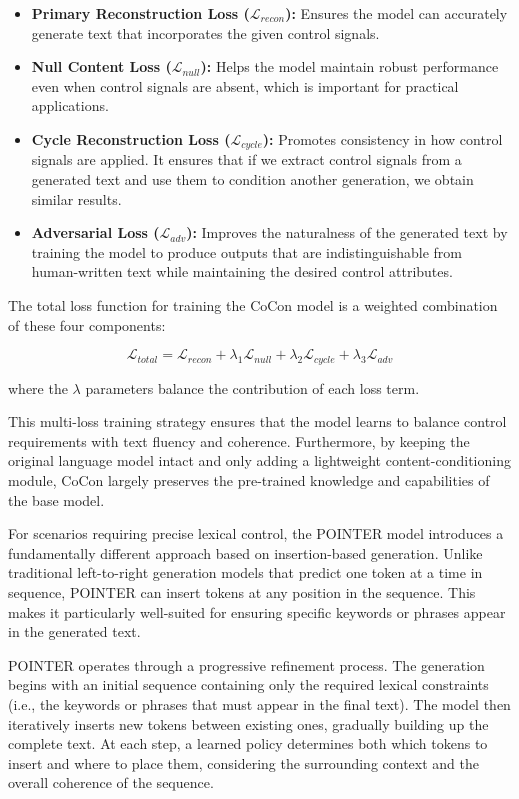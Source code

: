 \begin{itemize}
   \item \textbf{Primary Reconstruction Loss ($\mathcal{L}_{recon}$):} Ensures the model can accurately generate text that incorporates the given control signals.
   \item \textbf{Null Content Loss ($\mathcal{L}_{null}$):} Helps the model maintain robust performance even when control signals are absent, which is important for practical applications.
   \item \textbf{Cycle Reconstruction Loss ($\mathcal{L}_{cycle}$):} Promotes consistency in how control signals are applied. It ensures that if we extract control signals from a generated text and use them to condition another generation, we obtain similar results.
   \item \textbf{Adversarial Loss ($\mathcal{L}_{adv}$):} Improves the naturalness of the generated text by training the model to produce outputs that are indistinguishable from human-written text while maintaining the desired control attributes.
\end{itemize}

The total loss function for training the CoCon model is a weighted combination of these four components:

\begin{equation}
    \mathcal{L}_{total} = \mathcal{L}_{recon} + \lambda_1 \mathcal{L}_{null} + \lambda_2 \mathcal{L}_{cycle} + \lambda_3 \mathcal{L}_{adv}
\end{equation}

where the $\lambda$ parameters balance the contribution of each loss term.

This multi-loss training strategy ensures that the model learns to balance control requirements with text fluency and coherence.
Furthermore, by keeping the original language model intact and only adding a lightweight content-conditioning module, CoCon largely preserves the pre-trained knowledge and capabilities of the base model.

For scenarios requiring precise lexical control, the POINTER model \cite{zhang-etal-2020-pointer} introduces a fundamentally different approach based on insertion-based generation. 
Unlike traditional left-to-right generation models that predict one token at a time in sequence, POINTER can insert tokens at any position in the sequence. 
This makes it particularly well-suited for ensuring specific keywords or phrases appear in the generated text.

POINTER operates through a progressive refinement process. 
The generation begins with an initial sequence containing only the required lexical constraints (i.e., the keywords or phrases that must appear in the final text). The model then iteratively inserts new tokens between existing ones, gradually building up the complete text. At each step, a learned policy determines both which tokens to insert and where to place them, considering the surrounding context and the overall coherence of the sequence.

